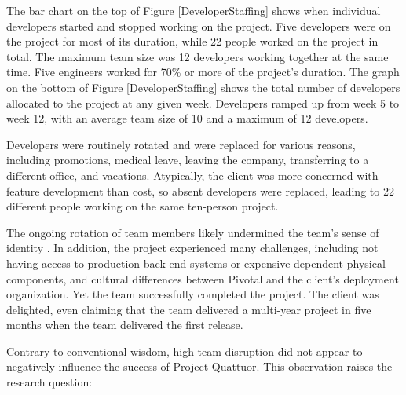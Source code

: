 The bar chart on the top of Figure \ref{DeveloperStaffing} shows when individual developers started and stopped working on the project. Five developers were on the project for most of its duration, while 22 people worked on the project in total. The maximum team size was 12 developers working together at the same time. Five engineers worked for 70\% or more of the project's duration. The graph on the bottom of Figure \ref{DeveloperStaffing} shows the total number of developers allocated to the project at any given week. Developers ramped up from week 5 to week 12, with an average team size of 10 and a maximum of 12 developers.

Developers were routinely rotated and were replaced for various reasons, including promotions, medical leave, leaving the company, transferring to a different office, and vacations. Atypically, the client was more concerned with feature development than cost, so absent developers were replaced, leading to 22 different people working on the same ten-person project. 

The ongoing rotation of team members likely undermined the team's sense of identity \cite{TuckmanModel}. In addition, the project experienced many challenges, including not having access to production back-end systems or expensive dependent physical components, and cultural differences between Pivotal and the client's deployment organization. Yet the team successfully completed the project. The client was delighted, even claiming that the team delivered a multi-year project in five months when the team delivered the first release. 

Contrary to conventional wisdom, high team disruption did not appear to negatively influence the success of Project Quattuor. This observation raises the research question: 



